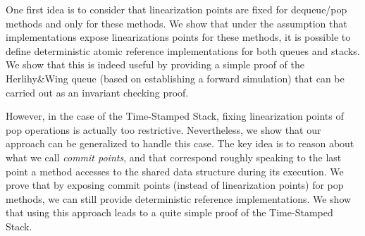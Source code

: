 One first idea is to consider that linearization points are fixed for dequeue/pop methods and only for these methods. We show that under the assumption that implementations expose linearizations points for these methods, it is possible to define deterministic atomic reference implementations for both queues and stacks. We show that this is indeed useful by providing a simple proof of the Herlihy\&Wing queue (based on establishing a forward simulation) that can be carried out as an invariant checking proof.

However, in the case of the Time-Stamped Stack, fixing linearization points of pop operations is actually too restrictive. Nevertheless, we show that our approach can be generalized to handle this case. The key idea is to reason about what we call {\em commit points}, and  that correspond roughly speaking to the last point a method accesses to the shared data structure during its execution. We prove that by exposing commit points (instead of linearization points) for pop methods, we can still provide deterministic reference implementations. We show that using this approach leads to a quite simple proof of the Time-Stamped Stack.


